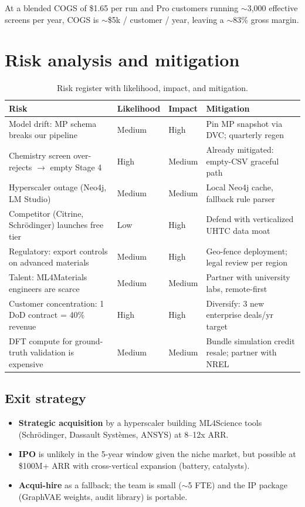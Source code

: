 \documentclass[11pt,a4paper]{report}
\begin{document}
At a blended COGS of \$1.65 per run and Pro customers running $\sim$3{,}000 effective screens
per year, COGS is $\sim$\$5k / customer / year, leaving a $\sim$83\% gross margin.

\chapter{Risk analysis and mitigation}

\begin{table}[h]
\centering
\caption{Risk register with likelihood, impact, and mitigation.}
\label{tab:risk}
\small
\begin{tabular}{p{3.6cm}p{2.4cm}p{1.6cm}p{6.6cm}}
\toprule
\textbf{Risk} & \textbf{Likelihood} & \textbf{Impact} & \textbf{Mitigation} \\
\midrule
Model drift: MP schema breaks our pipeline & Medium & High & Pin MP snapshot via DVC; quarterly regen \\
Chemistry screen over-rejects $\to$ empty Stage 4 & High & Medium & Already mitigated: empty-CSV graceful path \\
Hyperscaler outage (Neo4j, LM Studio) & Medium & Medium & Local Neo4j cache, fallback rule parser \\
Competitor (Citrine, Schrödinger) launches free tier & Low & High & Defend with verticalized UHTC data moat \\
Regulatory: export controls on advanced materials & Medium & High & Geo-fence deployment; legal review per region \\
Talent: ML4Materials engineers are scarce & Medium & Medium & Partner with university labs, remote-first \\
Customer concentration: 1 DoD contract = 40\% revenue & High & High & Diversify: 3 new enterprise deals/yr target \\
DFT compute for ground-truth validation is expensive & Medium & Medium & Bundle simulation credit resale; partner with NREL \\
\bottomrule
\end{tabular}
\end{table}

\section{Exit strategy}

\begin{itemize}[leftmargin=*,itemsep=2pt]
\item \textbf{Strategic acquisition} by a hyperscaler building ML4Science tools
      (Schrödinger, Dassault Systèmes, ANSYS) at 8--12x ARR.
\item \textbf{IPO} is unlikely in the 5-year window given the niche market, but possible at
      \$100M+ ARR with cross-vertical expansion (battery, catalysts).
\item \textbf{Acqui-hire} as a fallback; the team is small ($\sim$5 FTE) and the
      IP package (GraphVAE weights, audit library) is portable.
\end{itemize}
\end{document}
